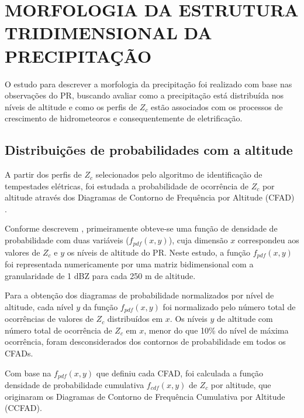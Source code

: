 
\section{MORFOLOGIA DA ESTRUTURA TRIDIMENSIONAL DA PRECIPITAÇÃO}
\label{metodologiaPrec3D}

O estudo para descrever a morfologia da precipitação foi realizado com base nas observações do PR, buscando avaliar como a precipitação está distribuída nos níveis de altitude e como os perfis de $Z_c$ estão associados com os processos de crescimento de hidrometeoros e consequentemente de eletrificação.  

\subsection{Distribuições de probabilidades com a altitude}

A partir dos perfis de $Z_c$ selecionados pelo algoritmo de identificação de tempestades elétricas, foi estudada a probabilidade de ocorrência de $Z_c$ por altitude através dos Diagramas de Contorno de Frequência por Altitude (CFAD) \cite{yuter1995}.

Conforme descrevem , primeiramente obteve-se uma função de densidade de probabilidade com duas variáveis ($f_{pdf}(x,y)$), cuja  dimensão $x$ correspondeu aos valores de $Z_{c}$ e $y$ os níveis de altitude do PR. Neste estudo, a função $f_{pdf}(x,y)$ foi representada numericamente por uma matriz bidimensional com a granularidade de 1 dBZ para cada 250 m de altitude.



Para a obtenção dos diagramas de probabilidade normalizados por nível de altitude, cada nível $y$ da função $f_{pdf}(x,y)$ foi normalizado pelo número total de ocorrências de valores de $Z_c$ distribuídos em $x$. Os níveis $y$ de altitude com número total de ocorrência de $Z_c$ em $x$, menor do que 10\% do nível de máxima ocorrência, foram desconsiderados dos contornos de probabilidade em todos os CFADs.

Com base na $f_{pdf}(x,y)$ que definiu cada CFAD, foi calculada a função densidade de probabilidade cumulativa $f_{cdf}(x,y)$ de $Z_c$ por altitude, que originaram os Diagramas de Contorno de Frequência Cumulativa por Altitude (CCFAD).     

